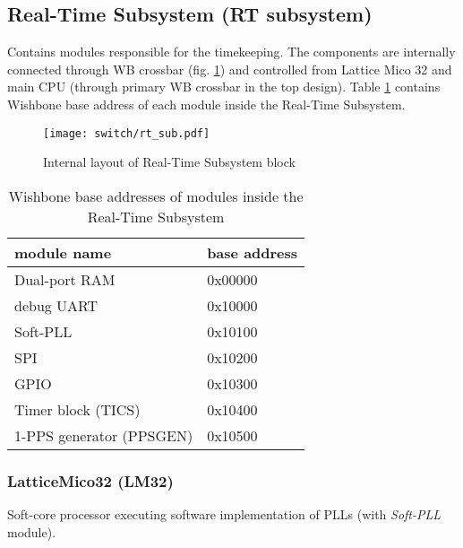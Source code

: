 \subsection{Real-Time Subsystem (RT subsystem)}

Contains modules responsible for the timekeeping. The components are internally connected
through WB crossbar (fig. \ref{fig:rts:hdl}) and controlled from Lattice Mico 32
and main CPU (through primary WB crossbar in the top design). Table
\ref{tab:rts:wb_base} contains Wishbone base address of each module inside the
Real-Time Subsystem.

\begin{figure}[ht]
  \begin{center}
    \texttt{[image: switch/rt\_sub.pdf]}
    \caption{Internal layout of Real-Time Subsystem block}
    \label{fig:rts:hdl}
  \end{center}
\end{figure}

\begin{table}[ht]
  \begin{center}
  \begin{tabular}{|l|l|}
    \hline
    module name & base address\\
    \hline \hline
    Dual-port RAM & 0x00000\\
    debug UART & 0x10000\\
    Soft-PLL & 0x10100\\
    SPI & 0x10200\\
    GPIO & 0x10300\\
    Timer block (TICS) & 0x10400\\
    1-PPS generator (PPSGEN) & 0x10500\\
    \hline
  \end{tabular}
  \caption{Wishbone base addresses of modules inside the Real-Time Subsystem}
  \label{tab:rts:wb_base}
  \end{center}
\end{table}

\subsubsection{LatticeMico32 (LM32)}

Soft-core processor executing software implementation of PLLs (with
\emph{Soft-PLL} module).\\


